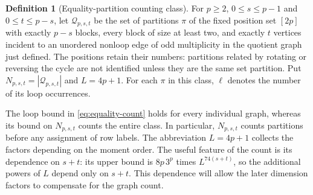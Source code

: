 \documentclass[11pt]{article}
\theoremstyle{definition}
\newtheorem{definition}{Definition}[section]
\theoremstyle{remark}
\theoremstyle{plain}
\begin{document}
\begin{definition}[Equality-partition counting class]
\label{def:equality-class}
For $p\ge2$, $0\le s\le p-1$ and $0\le t\le p-s$,
let $\mathcal Q_{p,s,t}$ be the set of partitions $\pi$ of the
fixed position set $[2p]$ with exactly $p-s$ blocks, every block of
size at least two, and exactly $t$ vertices incident to an unordered
nonloop edge of odd multiplicity in the quotient graph just
defined. The positions retain their numbers: partitions related
by rotating or reversing the cycle are not identified unless they
are the same set partition. Put $N_{p,s,t}=|\mathcal Q_{p,s,t}|$
and $L=4p+1$. For each $\pi$ in this class, $\ell$ denotes the
number of its loop occurrences.
\end{definition}

The loop bound in
\eqref{eq:equality-count} holds for every individual graph,
whereas its bound on $N_{p,s,t}$ counts the entire class.
In particular, \(N_{p,s,t}\) counts partitions before any
assignment of row labels.
The abbreviation $L=4p+1$ collects the factors depending on the
moment order. The useful feature of the count is its dependence on
$s+t$: its upper bound is $8p\,3^p$ times $L^{74(s+t)}$, so
the additional powers of $L$ depend only on $s+t$. This dependence will
allow the later dimension factors to compensate for the graph count.
\end{document}
